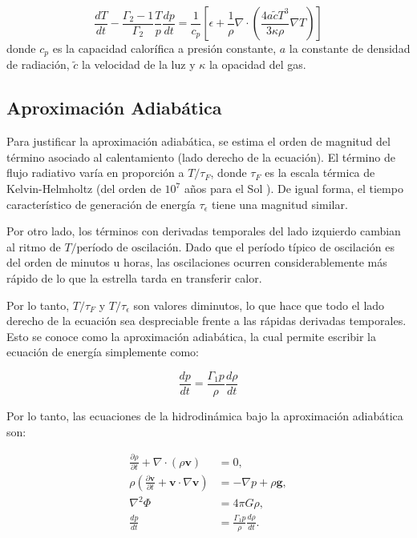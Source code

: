 \begin{equation} \frac{dT}{dt} - \frac{\Gamma_2 - 1}{\Gamma_2} \frac{T}{p} \frac{dp}{dt} = \frac{1}{c_p} \left[ \epsilon + \frac{1}{\rho} \nabla \cdot \left( \frac{4 a \tilde{c} T^3}{3 \kappa \rho} \nabla T \right) \right]
\end{equation}
donde $c_p$ es la capacidad calorífica a presión constante, $a$ la constante de densidad de radiación, $\tilde{c}$ la velocidad de la luz y $\kappa$ la opacidad del gas.

\subsection{Aproximación Adiabática}

Para justificar la aproximación adiabática, se estima el orden de magnitud del término asociado al calentamiento (lado derecho de la ecuación). El término de flujo radiativo varía en proporción a $T / \tau_F$, donde $\tau_F$ es la escala térmica de Kelvin-Helmholtz (del orden de $10^7$ años para el Sol \citep{ChristensenDalsgaard2019}). De igual forma, el tiempo característico de generación de energía $\tau_\epsilon$ tiene una magnitud similar.

Por otro lado, los términos con derivadas temporales del lado izquierdo cambian al ritmo de $T/\text{período de oscilación}$. Dado que el período típico de oscilación es del orden de minutos u horas, las oscilaciones ocurren considerablemente más rápido de lo que la estrella tarda en transferir calor.

Por lo tanto, $T/\tau_F$ y $T/\tau_\epsilon$ son valores diminutos, lo que hace que todo el lado derecho de la ecuación sea despreciable frente a las rápidas derivadas temporales. Esto se conoce como la aproximación adiabática, la cual permite escribir la ecuación de energía simplemente como:

\begin{equation}
  \frac{dp}{dt} = \frac{\Gamma_1 p}{\rho} \frac{d\rho}{dt}
\end{equation}

Por lo tanto, las ecuaciones de la hidrodinámica bajo la aproximación adiabática son:

\begin{align*}
  \frac{\partial \rho}{\partial t} + \nabla \cdot (\rho \mathbf{v}) &= 0, \\
  \rho \left( \frac{\partial \mathbf{v}}{\partial t} + \mathbf{v} \cdot \nabla \mathbf{v} \right) &= -\nabla p + \rho \mathbf{g}, \\
  \nabla^2 \Phi &= 4 \pi G \rho,\\
  \frac{dp}{dt} &= \frac{\Gamma_1 p}{\rho} \frac{d\rho}{dt}.
\end{align*}

